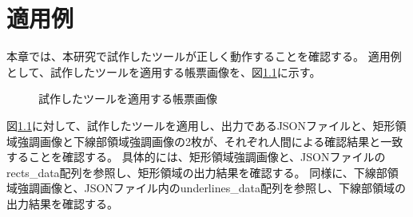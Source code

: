 \chapter{適用例}\label{cha:Indication}
本章では、本研究で試作したツールが正しく動作することを確認する。
適用例として、試作したツールを適用する帳票画像を、図\ref{fig:indication_original}に示す。

\begin{figure}[t]
    \begin{center}
        \caption{試作したツールを適用する帳票画像}
        \label{fig:indication_original}
    \end{center}
\end{figure}

図\ref{fig:indication_original}に対して、試作したツールを適用し、出力であるJSONファイルと、矩形領域強調画像と下線部領域強調画像の2枚が、それぞれ人間による確認結果と一致することを確認する。
具体的には、矩形領域強調画像と、JSONファイルのrects\_data配列を参照し、矩形領域の出力結果を確認する。
同様に、下線部領域強調画像と、JSONファイル内のunderlines\_data配列を参照し、下線部領域の出力結果を確認する。

